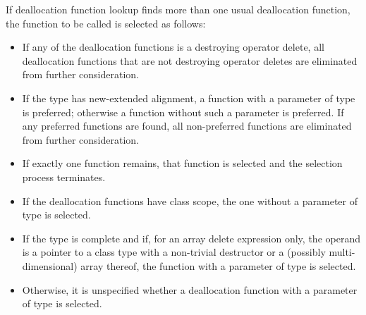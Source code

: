 \pnum
If deallocation function lookup finds more than one usual
deallocation function,
the function to be called is selected as follows:
\begin{itemize}
\item
If any of the deallocation functions is a destroying operator delete,
all deallocation functions that are not destroying operator deletes
are eliminated from further consideration.
\item
If the type has new-extended alignment,
a function with a parameter of type  is preferred;
otherwise a function without such a parameter is preferred.
If any preferred functions are found,
all non-preferred functions are eliminated from further consideration.
\item
If exactly one function remains,
that function is selected and the selection process terminates.
\item
If the deallocation functions have class scope,
the one without a parameter of type  is selected.
\item
If the type is complete
and if, for an array delete expression only,
the operand is a pointer to a class type with a
non-trivial destructor or a (possibly multi-dimensional) array thereof,
the function with a parameter of type  is selected.
\item
Otherwise, it is unspecified
whether a deallocation function with a parameter of type 
is selected.
\end{itemize}

